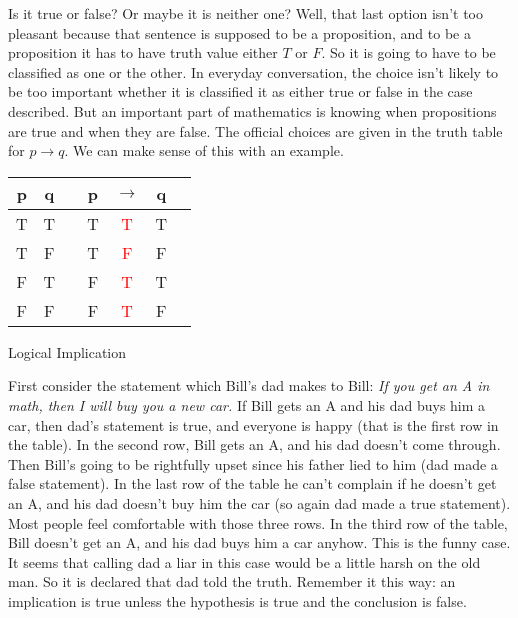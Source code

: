Is it true or false? Or maybe it is neither one? Well, that last option isn't too
pleasant because that sentence is supposed to be  a proposition, and to be a
proposition it has to have truth value either $T$ or $F$. So it is  going to have
to be classified as  one  or the other.
  In everyday conversation, the choice isn't likely to be too important whether it is
classified it as either true or false in the case described. But
an important part of mathematics is knowing when propositions are true and when they
are 
false.  The official choices are given in
the truth table for $p\to q$. We can make sense of this with an example.
\begin{margintable}
\begin{tabular}{@{ }c@{ }@{ }c | c@{ }@{ }c@{ }@{ }c@{ }@{ }c@{ }@{ }c}
p & q &  & p & $\rightarrow$ & q & \\
\hline 
T & T &  & T & \textcolor{red}{T} & T & \\
T & F &  & T & \textcolor{red}{F} & F & \\
F & T &  & F & \textcolor{red}{T} & T & \\
F & F &  & F & \textcolor{red}{T} & F & \\
\end{tabular}
\caption{Logical Implication}
\label{tbl:implication}
\end{margintable}
\begin{exmp}
 First consider the statement which Bill's dad makes to Bill:
{\itshape If you get an A in math, then I will buy you a new car.}
If Bill gets an A and his dad buys him a car, then dad's statement is true, and everyone is happy (that is the first row 
in the table).  In the second row, Bill gets an A, and his dad 
doesn't come through. Then Bill's going to be rightfully upset since his father lied to him (dad made a false statement).
In the last row of the table 
he can't complain if he doesn't get an A, and his dad doesn't buy him the car (so again dad made a true statement). 
Most people feel comfortable with 
those three rows.  In the third row of the table, Bill doesn't get an A, and his dad  buys him a car anyhow. 
This is the funny case. It seems that calling dad a liar in this
case would be a little harsh on the old man. So it is declared that dad told the truth. 
Remember it this way: an implication is true unless the hypothesis is true and the conclusion is false.
\end{exmp}


